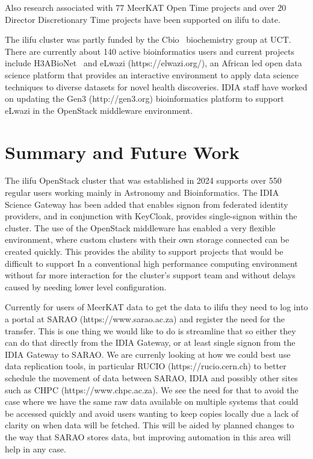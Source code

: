 \documentclass{iau_FM}
\begin{document}
Also research associated with 
77 MeerKAT Open Time projects and over 20 Director Discretionary Time projects have been supported
on ilifu to date.


The ilifu cluster was partly funded by the Cbio~\cite{cbio}
biochemistry group at UCT.
There are currently about 140 active bioinformatics users and 
current projects include H3ABioNet~\cite{H3ABioNet}
and eLwazi (https://elwazi.org/),
an African led open data science platform that provides an interactive environment 
to apply data science techniques to 
diverse datasets for novel health discoveries.
IDIA staff have worked on updating the Gen3 (http://gen3.org) bioinformatics platform 
to support eLwazi in the OpenStack
middleware environment.


\section{Summary and Future Work}
\label{sec:conclusions}


The ilifu OpenStack cluster that was established in 2024 supports over 550 regular users working mainly in Astronomy
and Bioinformatics. The IDIA Science Gateway has been added that enables signon from federated identity providers, and 
in conjunction with KeyCloak, provides single-signon within the cluster. The use of the OpenStack middleware
has enabled a very flexible environment, where custom clusters with their own storage connected can be
created quickly. This provides the ability to support projects that would be difficult to support In
a conventional high performance computing environment without far more interaction for the cluster's
support team and without delays caused by needing lower level configuration.

Currently for users of MeerKAT data to get the data to ilifu they need to log into a portal at SARAO
(https://www.sarao.ac.za)
and register the need for the transfer. This is one thing we would like to do is streamline that so either
they can do that directly from the IDIA Gateway, or at least single signon from the IDIA Gateway
to SARAO. We are currenly looking at how we could best use data replication tools, in particular
RUCIO (https://rucio.cern.ch) to better schedule the movement of data between SARAO, 
IDIA and possibly other sites such 
as CHPC (https://www.chpc.ac.za). We see the need for that to avoid the case where 
we have the same raw data available
on multiple systems that could be accessed quickly and avoid users wanting to keep copies locally
due a lack of clarity on when data will be fetched. This will be aided by planned changes to the
way that SARAO stores data, but improving automation in this area will help in any case.
\end{document}
